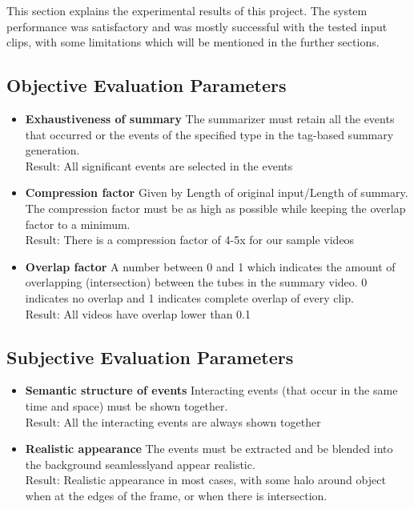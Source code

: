 This section explains the experimental results of this project. The system performance was satisfactory and was mostly successful with the tested input clips, with some limitations which will be mentioned in the further sections.

    \subsection{Objective Evaluation Parameters}

    \begin{itemize}
        \item \textbf{Exhaustiveness of summary}
        The summarizer must retain all the events that occurred or the events of the specified type in the tag-based summary generation. \\
        Result: All significant events are selected in the events
        \item \textbf{Compression factor}
        Given by Length of original input/Length of summary. The compression factor must be as high as possible while keeping the overlap factor to a minimum. \\
        Result: There is a compression factor of 4-5x for our sample videos
        \item \textbf{Overlap factor}
        A number between 0 and 1 which indicates the amount of overlapping (intersection) between the tubes in the summary video. 0 indicates no overlap and 1 indicates complete overlap of every clip. \\
        Result: All videos have overlap lower than 0.1
    \end{itemize}

    \subsection{Subjective Evaluation Parameters}

    \begin{itemize}
        \item \textbf{Semantic structure of events}
        Interacting events (that occur in the same time and space) must be shown together. \\
        Result: All the interacting events are always shown together
        \item \textbf{Realistic appearance}
        The events must be extracted and be blended into the background seamlesslyand appear realistic. \\
        Result: Realistic appearance in most cases, with some halo around object when at the edges of the frame, or when there is intersection.
    \end{itemize}


